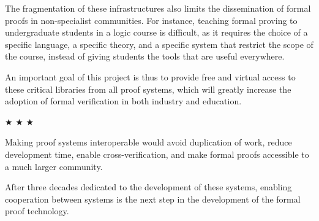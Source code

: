 The fragmentation of these infrastructures also limits the
dissemination of formal proofs in non-specialist communities. For
instance, teaching formal proving to undergraduate students in a logic
course is difficult, as it requires the choice of a specific language,
a specific theory, and a specific system that restrict the scope of the
course, instead of giving students the tools that are useful
everywhere. 

An important goal of this project is thus to provide free and virtual
access to these critical libraries from all proof systems,
which will greatly increase the adoption of formal verification in
both industry and education.


\begin{center}
$\bigstar$ $\bigstar$ $\bigstar$
\end{center}

Making proof systems interoperable would avoid duplication of work,
reduce development time, enable cross-verification, and make formal
proofs accessible to a much larger community.  

After three decades
dedicated to the development of these systems, enabling
cooperation between systems is the next step in the development of the
formal proof technology.

\medskip

